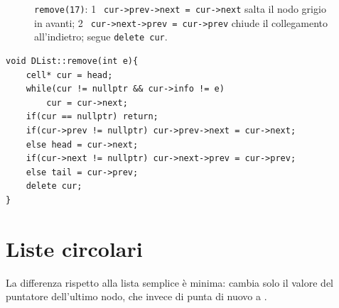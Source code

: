 \begin{figure}[ht]
\begin{center}
\caption{\texttt{remove(17)}: \textcircled{1}~\texttt{cur->prev->next = cur->next} salta il nodo grigio in avanti; \textcircled{2}~\texttt{cur->next->prev = cur->prev} chiude il collegamento all'indietro; segue \texttt{delete cur}.}
\label{fig:dremove}
\end{center}
\end{figure}

\begin{codebox}
    \begin{lstlisting}
void DList::remove(int e){
    cell* cur = head;
    while(cur != nullptr && cur->info != e)
        cur = cur->next;
    if(cur == nullptr) return;
    if(cur->prev != nullptr) cur->prev->next = cur->next;
    else head = cur->next;
    if(cur->next != nullptr) cur->next->prev = cur->prev;
    else tail = cur->prev;
    delete cur;
}
    \end{lstlisting}
\end{codebox}

\section{Liste circolari}

La differenza rispetto alla lista semplice è minima: cambia solo il valore del puntatore  dell'ultimo nodo, che invece di  punta di nuovo a .

